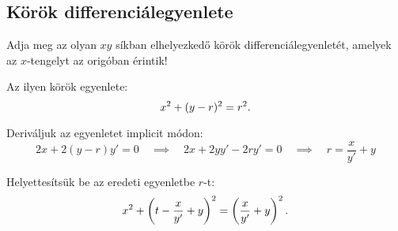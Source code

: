 \documentclass{szb-solution}
\begin{document}
\subsection{Körök differenciálegyenlete}

Adja meg az olyan $xy$ síkban elhelyezkedő körök differenciálegyenletét,
amelyek az $x$-ten\-gelyt az origóban érintik!

Az ilyen körök egyenlete:
$$
  x^2 + (y - r)^2 = r^2
  \text.
$$

Deriváljuk az egyenletet implicit módon:
$$
  2x + 2(y - r)y' = 0
  \quad \implies \quad
  2x + 2yy' - 2ry' = 0
  \quad \implies \quad
  r = \frac{x}{y'} + y
$$

Helyettesítsük be az eredeti egyenletbe $r$-t:
$$
  x^2 + \left(
  t - \frac{x}{y'} + y
  \right)^2 = \left(
  \frac{x}{y'} + y
  \right)^2
  \text.
$$
\end{document}
